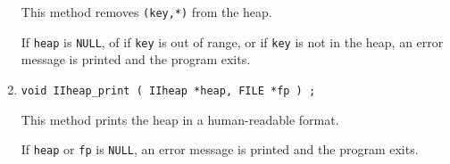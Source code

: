 \begin{enumerate}
This method removes {\tt (key,*)} from the heap.
\par {}
If {\tt heap} is {\tt NULL},
of if {\tt key} is out of range,
or if {\tt key} is not in the heap,
an error message is printed and the program exits.
\item
\begin{verbatim}
void IIheap_print ( IIheap *heap, FILE *fp ) ;
\end{verbatim}
This method prints the heap in a human-readable format.
\par {}
If {\tt heap} or {\tt fp} is {\tt NULL},
an error message is printed and the program exits.
\end{enumerate}
